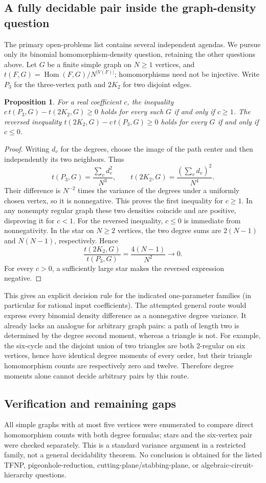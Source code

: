 \documentclass[11pt]{article}
\newtheorem{proposition}{Proposition}
\begin{document}
\subsection{A fully decidable pair inside the graph-density question}
The primary open-problems list contains several independent agendas. We pursue only its binomial homomorphism-density question, retaining the other questions above. Let $G$ be a finite simple graph on $N\ge1$ vertices, and $t(F,G)=\operatorname{Hom}(F,G)/N^{|V(F)|}$; homomorphisms need not be injective. Write $P_3$ for the three-vertex path and $2K_2$ for two disjoint edges.
\begin{proposition}
For a real coefficient $c$, the inequality $c\,t(P_3,G)-t(2K_2,G)\ge0$ holds for every such $G$ if and only if $c\ge1$. The reversed inequality $t(2K_2,G)-c\,t(P_3,G)\ge0$ holds for every $G$ if and only if $c\le0$.
\end{proposition}
\begin{proof}
Writing $d_v$ for the degrees, choose the image of the path center and then independently its two neighbors. Thus
\[
t(P_3,G)=\frac{\sum_v d_v^2}{N^3},\qquad
 t(2K_2,G)=\frac{(\sum_v d_v)^2}{N^4}.
\]
Their difference is $N^{-2}$ times the variance of the degrees under a uniformly chosen vertex, so it is nonnegative. This proves the first inequality for $c\ge1$. In any nonempty regular graph these two densities coincide and are positive, disproving it for $c<1$.
For the reversed inequality, $c\le0$ is immediate from nonnegativity. In the star on $N\ge2$ vertices, the two degree sums are $2(N-1)$ and $N(N-1)$, respectively. Hence
\[
\frac{t(2K_2,G)}{t(P_3,G)}=\frac{4(N-1)}{N^2}\longrightarrow0.
\]
For every $c>0$, a sufficiently large star makes the reversed expression negative.
\end{proof}
This gives an explicit decision rule for the indicated one-parameter families (in particular for rational input coefficients). The attempted general route would express every binomial density difference as a nonnegative degree variance. It already lacks an analogue for arbitrary graph pairs: a path of length two is determined by the degree second moment, whereas a triangle is not. For example, the six-cycle and the disjoint union of two triangles are both 2-regular on six vertices, hence have identical degree moments of every order, but their triangle homomorphism counts are respectively zero and twelve. Therefore degree moments alone cannot decide arbitrary pairs by this route.
\subsection{Verification and remaining gaps}
All simple graphs with at most five vertices were enumerated to compare direct homomorphism counts with both degree formulas; stars and the six-vertex pair were checked separately. This is a standard variance argument in a restricted family, not a general decidability theorem. No conclusion is obtained for the listed TFNP, pigeonhole-reduction, cutting-plane/stabbing-plane, or algebraic-circuit-hierarchy questions.
\end{document}
